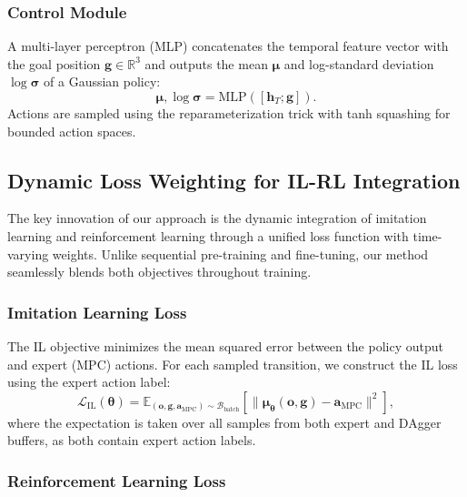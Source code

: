 \subsubsection{Control Module}

A multi-layer perceptron (MLP) concatenates the temporal feature vector with the goal position $\mathbf{g} \in \mathbb{R}^3$ and outputs the mean $\boldsymbol{\mu}$ and log-standard deviation $\log \boldsymbol{\sigma}$ of a Gaussian policy:
\begin{equation}
\boldsymbol{\mu}, \log \boldsymbol{\sigma} = \text{MLP}([\mathbf{h}_T; \mathbf{g}]).
\label{eq:mlp}
\end{equation}
Actions are sampled using the reparameterization trick with tanh squashing for bounded action spaces.

\subsection{Dynamic Loss Weighting for IL-RL Integration}
\label{sec:dynamic_weighting}

The key innovation of our approach is the dynamic integration of imitation learning and reinforcement learning through a unified loss function with time-varying weights. Unlike sequential pre-training and fine-tuning, our method seamlessly blends both objectives throughout training.

\subsubsection{Imitation Learning Loss}

The IL objective minimizes the mean squared error between the policy output and expert (MPC) actions. For each sampled transition, we construct the IL loss using the expert action label:
\begin{equation}
\mathcal{L}_{\text{IL}}(\boldsymbol{\theta}) = \mathbb{E}_{(\mathbf{o}, \mathbf{g}, \mathbf{a}_{\text{MPC}}) \sim \mathcal{B}_{\text{batch}}} \left[ \| \boldsymbol{\mu}_{\boldsymbol{\theta}}(\mathbf{o}, \mathbf{g}) - \mathbf{a}_{\text{MPC}} \|^2 \right],
\label{eq:il_loss}
\end{equation}
where the expectation is taken over all samples from both expert and DAgger buffers, as both contain expert action labels.

\subsubsection{Reinforcement Learning Loss}

